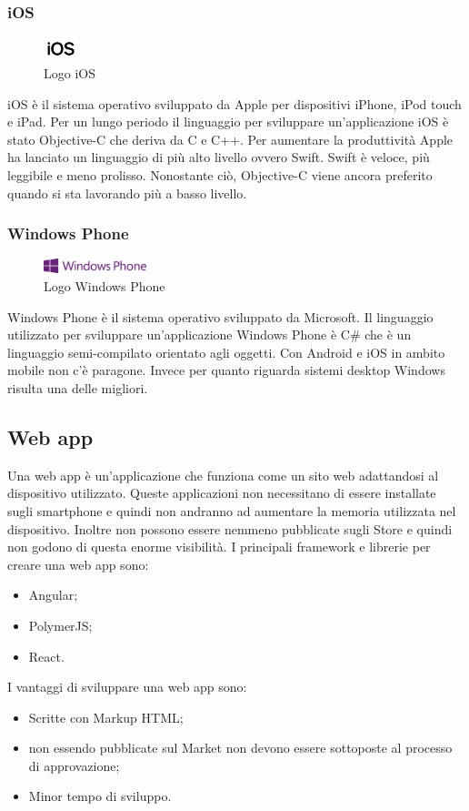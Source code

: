  \subsubsection{iOS}
 \begin{figure}[htbp]	
 	\centering
 	\includegraphics[width=1cm]{immagini/logoios.jpg}
 	\caption{Logo iOS}
 	\label{fig:Logo iOS}
 \end{figure}
 iOS è il sistema operativo sviluppato da Apple per dispositivi iPhone, iPod touch e iPad.
 Per un lungo periodo il linguaggio per sviluppare un'applicazione iOS è stato Objective-C che deriva da C e C++. 
 Per aumentare la produttività Apple ha lanciato un linguaggio di più alto livello ovvero Swift. Swift è veloce, più leggibile e meno prolisso. Nonostante ciò, Objective-C viene ancora preferito quando si sta lavorando più a basso livello.

 \subsubsection{Windows Phone}
 \begin{figure}[htbp]	
 	\centering
 	\includegraphics[width=3cm]{immagini/logowindowsphone.png}
 	\caption{Logo Windows Phone}
 	\label{fig:Logo Windows Phone}
 \end{figure}
Windows Phone è il sistema operativo sviluppato da Microsoft.
Il linguaggio utilizzato per sviluppare un'applicazione Windows Phone è C\# che è un linguaggio semi-compilato orientato agli oggetti.
Con Android e iOS in ambito mobile non c'è paragone. Invece per quanto riguarda sistemi desktop Windows risulta una delle migliori.\\
 
\subsection{Web app}
Una web app è un'applicazione che funziona come un sito web adattandosi al dispositivo utilizzato.
Queste applicazioni non necessitano di essere installate sugli smartphone e quindi non andranno ad aumentare la memoria utilizzata nel dispositivo. Inoltre non possono essere nemmeno pubblicate sugli Store e quindi non godono di questa enorme visibilità.
I principali framework e librerie per creare una web app sono:
\begin{itemize}
	\item Angular; 
	\item PolymerJS; 
	\item React.
\end{itemize}
I vantaggi di sviluppare una web app sono:
\begin{itemize}
	\item Scritte con Markup HTML;
	\item non essendo pubblicate sul Market non devono essere sottoposte al processo di approvazione; 
	\item Minor tempo di sviluppo.
\end{itemize}
\newpage
